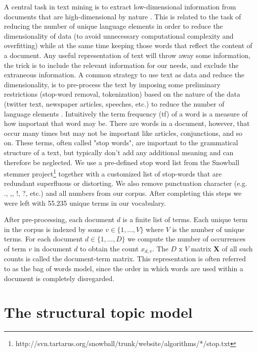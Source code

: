 \documentclass[12pt,a4paper,notitlepage]{article}
\begin{document}
A central task in text mining is to extract low-dimensional information from documents that are high-dimensional by nature \citep{bholat_text_2015}. This is related to the task of reducing the number of unique language elements in order to reduce the dimensionality of data (to avoid unnecessary computational complexity and overfitting) while at the same time keeping those words that reflect the content of a document. Any useful representation of text will throw away some information, the trick is to include the relevant information for our needs, and exclude the extraneous information. A common strategy to use text as data and reduce the dimensionality, is to pre-process the text by imposing some preliminary restrictions (stop-word removal, tokenization) based on the nature of the data (twitter text, newspaper articles, speeches, etc.) to reduce the number of language elements \citep{gentzkow_text_2017}. Intuitively the term frequency (tf) of a word is a measure of how important that word may be. There are words in a document, however, that occur many times but may not be important like articles, conjunctions, and so on. These terms, often called "stop words", are important to the grammatical structure of a text, but typically don't add any additional meaning and can therefore be neglected. We use a pre-defined stop word list from the Snowball stemmer project\footnote{http://svn.tartarus.org/snowball/trunk/website/algorithms/*/stop.txt} together with a customized list of stop-words that are redundant superfluous or distorting. We also remove punctuation character (e.g. ., ,, !, ?, etc.) and all numbers from our corpus. After completing this steps we were left with 55.235 unique terms in our vocabulary.

After pre-processing, each document $d$ is a finite list of terms. Each unique term in the corpus is indexed by some $v \in \lbrace 1,...,V \rbrace$ where $V$ is the number of unique terms. For each document $d \in \lbrace 1,...,D \rbrace$ we compute the number of occurrences of term $v$ in document $d$ to obtain the count $x_{d,v}$. The $D$ x $V$ matrix $\boldsymbol{X}$ of all such counts is called the document-term matrix. This representation is often referred to as the bag of words model, since the order in which words are used within a document is completely disregarded. 

\section{The structural topic model}\label{ch_model}
\end{document}
